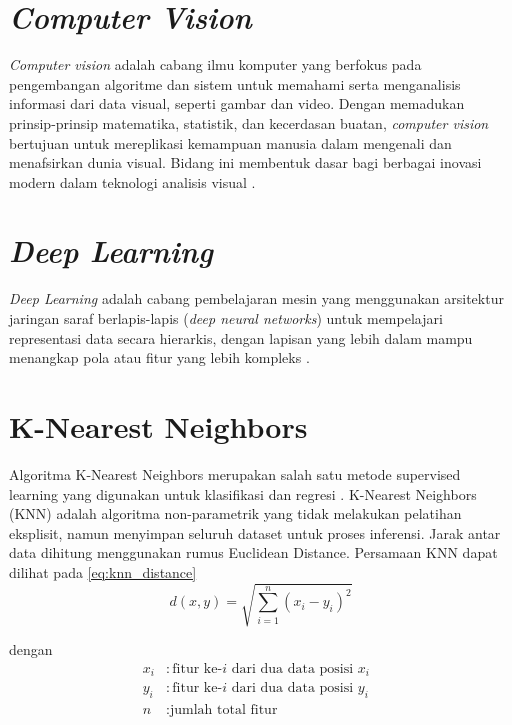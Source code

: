 \section{\textit{Computer Vision}}
\par \textit{Computer vision} adalah cabang ilmu komputer yang berfokus pada pengembangan algoritme dan sistem untuk memahami serta menganalisis informasi dari data visual, seperti gambar dan video. Dengan memadukan prinsip-prinsip matematika, statistik, dan kecerdasan buatan, \textit{computer vision} bertujuan untuk mereplikasi kemampuan manusia dalam mengenali dan menafsirkan dunia visual. Bidang ini membentuk dasar bagi berbagai inovasi modern dalam teknologi analisis visual \citep{szeliski2022computer}.

\section{\textit{Deep Learning}}
\par \textit{Deep Learning} adalah cabang pembelajaran mesin yang menggunakan arsitektur jaringan saraf berlapis-lapis (\textit{deep neural networks}) untuk mempelajari representasi data secara hierarkis, dengan lapisan yang lebih dalam mampu menangkap pola atau fitur yang lebih kompleks \citep{Goodfellow-et-al-2016}. 

\section{K-Nearest Neighbors}
\par Algoritma K-Nearest Neighbors merupakan salah satu metode supervised learning yang digunakan untuk klasifikasi dan regresi \cite{bishop2006pattern}. K-Nearest Neighbors (KNN) adalah algoritma non-parametrik yang tidak melakukan pelatihan eksplisit, namun menyimpan seluruh dataset untuk proses inferensi. Jarak antar data dihitung menggunakan rumus Euclidean Distance. Persamaan KNN dapat dilihat pada \ref{eq:knn_distance}
\vspace{-1em}
\begin{equation}
    d(x,y) = \sqrt{\sum_{i=1}^{n}(x_i - y_i)^2}
    \label{eq:knn_distance}
\end{equation}

\vspace{-1em}
\hspace{0.2cm}dengan
\vspace{-0.8em}
\begin{align*}
    x_i &: \text{fitur ke-}i\text{ dari dua data posisi $x_i$ } \\
    y_i &: \text{fitur ke-}i\text{ dari dua data posisi $y_i$} \\
    n        &: \text{jumlah total fitur}
\end{align*}

